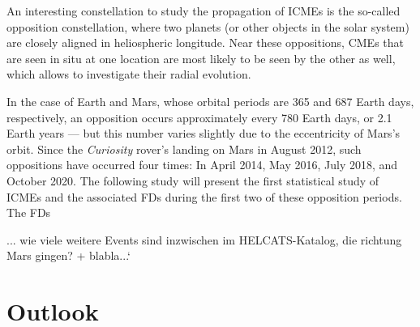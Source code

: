 An interesting constellation to study the propagation of \acp{ICME} is the so-called opposition constellation, where two planets (or other objects in the solar system) are closely aligned in heliospheric longitude. Near these oppositions, CMEs that are seen in situ at one location are most likely to be seen by the other as well, which allows to investigate their radial evolution.

In the case of Earth and Mars, whose orbital periods are 365 and 687 Earth days, respectively, an opposition occurs approximately every 780 Earth days, or 2.1 Earth years --- but this number varies slightly due to the eccentricity of Mars's orbit. Since the \textit{Curiosity} rover's landing on Mars in August 2012, such oppositions have occurred four times: In April 2014, May 2016, July 2018, and October 2020. The following study will present the first statistical study of \acp{ICME} and the associated \acp{FD} during the first two of these opposition periods. The \acp{FD}



... wie viele weitere Events sind inzwischen im HELCATS-Katalog, die richtung Mars gingen? + blabla...`




\section{Outlook}